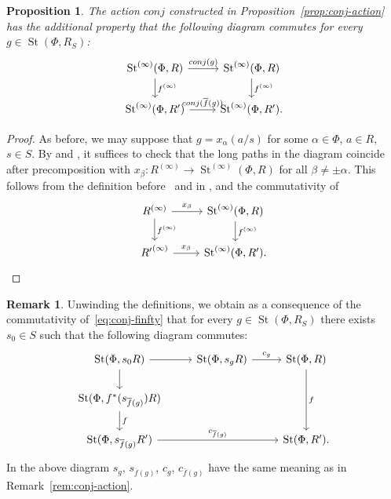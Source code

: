 \documentclass[oneside, 11pt]{amsart} \pdfoutput=1
\newcommand{\St}{\mathop{\mathrm{St}}\nolimits}
\numberwithin{equation}{section}
\newtheorem{prop}[lemma]{Proposition}
\theoremstyle{definition}
\newtheorem{rem}[lemma]{Remark}
\begin{document}
\begin{prop} \label{prop:functoriality}
 The action $conj$ constructed in Proposition~\ref{prop:conj-action} has the additional property that the following diagram commutes for every $g \in \St(\Phi, R_S)$:
 \begin{equation} \label{eq:conj-finfty} \begin{tikzcd} \St^{(\infty)}(\Phi, R) \ar{r}{conj(g)} \ar{d}{f^{(\infty)}} & \St^{(\infty)}(\Phi, R) \ar{d}{f^{(\infty)}} \\ \St^{(\infty)}(\Phi, R') \ar{r}{conj(\overline{f}(g))} & \St^{(\infty)}(\Phi, R'). \end{tikzcd} \end{equation}
\end{prop}
\begin{proof}
As before, we may suppose that \(g = x_\alpha(a/s)\) for some \(\alpha \in \Phi\), \(a \in R\), \(s \in S\). By \cite[Lemma~3.2]{LSV20} and \cite[Lemma~11]{V20}, it suffices to check that the long paths in the diagram coincide after precomposition with \(x_\beta \colon R^{(\infty)} \to \St^{(\infty)}(\Phi, R)\) for all \(\beta \neq \pm \alpha\). This follows from the definition before~\cite[Proposition~4.2]{LSV20} and in \cite[\S 10]{V20}, and the commutativity of
\[\begin{tikzcd}
R^{(\infty)} \ar{r}{x_\beta} \ar{d}{f^{(\infty)}} &
\St^{(\infty)}(\Phi, R) \ar{d}{f^{(\infty)}} \\
{R'}^{(\infty)} \ar{r}{x_\beta} & \St^{(\infty)}(\Phi, R'). \end{tikzcd}\]
\end{proof}

\begin{rem} \label{rem:functoriality}
 Unwinding the definitions, we obtain as a consequence of the commutativity of~\eqref{eq:conj-finfty} that for every $g \in \St(\Phi, R_S)$ there exists $s_0 \in S$ such that the following diagram commutes:
 \[ \begin{tikzcd} \St(\Phi, s_0R) \ar{r} \ar{d} & \St(\Phi, s_g R) \ar{r}{c_{g}} & \St(\Phi, R) \ar{dd}{f} \\
                   \St(\Phi, f^*(s_{\overline{f}(g)})R) \ar{d}{f}   & & \\
                   \St(\Phi, s_{\overline{f}(g)} R')   \ar{rr}{c_{\overline{f}(g)}} & & \St(\Phi, R'). \end{tikzcd} \]
 In the above diagram $s_g$, $s_{\overline{f}(g)}$, $c_g$, $c_{\overline{f}(g)}$ have the same meaning as in Remark~\ref{rem:conj-action}.
\end{rem}
\end{document}
